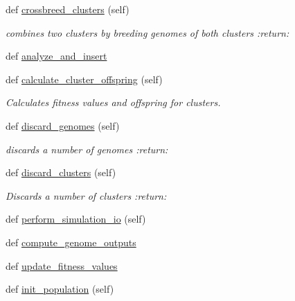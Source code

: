 \begin{DoxyCompactItemize}
def \hyperlink{classNEAT__PyGenetics_1_1NEAT_1_1Director_1_1MainDirector_1_1MainDirector_a24b32672d44473d0ed697d72326a3ed0}{crossbreed\+\_\+clusters} (self)
\begin{DoxyCompactList}\small\item\em combines two clusters by breeding genomes of both clusters \+:return\+: \end{DoxyCompactList}\item 
def \hyperlink{classNEAT__PyGenetics_1_1NEAT_1_1Director_1_1MainDirector_1_1MainDirector_af9ec8145b3a3dc21f823d38b3ea08df1}{analyze\+\_\+and\+\_\+insert}
\item 
def \hyperlink{classNEAT__PyGenetics_1_1NEAT_1_1Director_1_1MainDirector_1_1MainDirector_afc0fd1df30dc28284a1c9552b507298e}{calculate\+\_\+cluster\+\_\+offspring} (self)
\begin{DoxyCompactList}\small\item\em Calculates fitness values and offspring for clusters. \end{DoxyCompactList}\item 
def \hyperlink{classNEAT__PyGenetics_1_1NEAT_1_1Director_1_1MainDirector_1_1MainDirector_a477d29aba8bdf6743748389dce049b9a}{discard\+\_\+genomes} (self)
\begin{DoxyCompactList}\small\item\em discards a number of genomes \+:return\+: \end{DoxyCompactList}\item 
def \hyperlink{classNEAT__PyGenetics_1_1NEAT_1_1Director_1_1MainDirector_1_1MainDirector_a2916d65736e93f21a9a2a8f31d234615}{discard\+\_\+clusters} (self)
\begin{DoxyCompactList}\small\item\em Discards a number of clusters \+:return\+: \end{DoxyCompactList}\item 
def \hyperlink{classNEAT__PyGenetics_1_1NEAT_1_1Director_1_1MainDirector_1_1MainDirector_a233974c8f6d855886617f80737fb44eb}{perform\+\_\+simulation\+\_\+io} (self)
\item 
def \hyperlink{classNEAT__PyGenetics_1_1NEAT_1_1Director_1_1MainDirector_1_1MainDirector_a37de122cc8ac060871f2af4da1a0a1c1}{compute\+\_\+genome\+\_\+outputs}
\item 
def \hyperlink{classNEAT__PyGenetics_1_1NEAT_1_1Director_1_1MainDirector_1_1MainDirector_ab2602e228a2b8c979d4634ec21b542a8}{update\+\_\+fitness\+\_\+values}
\item 
def \hyperlink{classNEAT__PyGenetics_1_1NEAT_1_1Director_1_1MainDirector_1_1MainDirector_af3c8f23fba40f82bfa1a7d0b504bb218}{init\+\_\+population} (self)
\end{DoxyCompactItemize}
